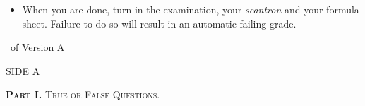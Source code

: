 \documentclass[legalpaper, 12pt, addpoints]{exam}
\begin{document}
\begin{coverpages}
\begin{center}
{{{\begin{itemize}
    \item When you are done, turn in the examination, your \textit{scantron} and your formula sheet. Failure to do so will result in an automatic failing grade.


    
\end{itemize} }}}
\vspace{0.2in}
\end{center}
\vspace{0.15in}
\runningheadrule \extraheadheight{0.14in}

              {\thepage\ of \numpages}
              {Version A}
\vspace{0.15in}

\vspace{0.1in}

\nopointsinmargin
\setlength\linefillthickness{0.1pt}
\setlength\answerlinelength{0.1in}
\end{coverpages}

\parbox{6in}{\textsc{{SIDE A}}

\vspace{0.15in}

\parbox{5in}{
{\textsc{\textbf{Part I.} True or False Questions.}}}}
\end{document}
